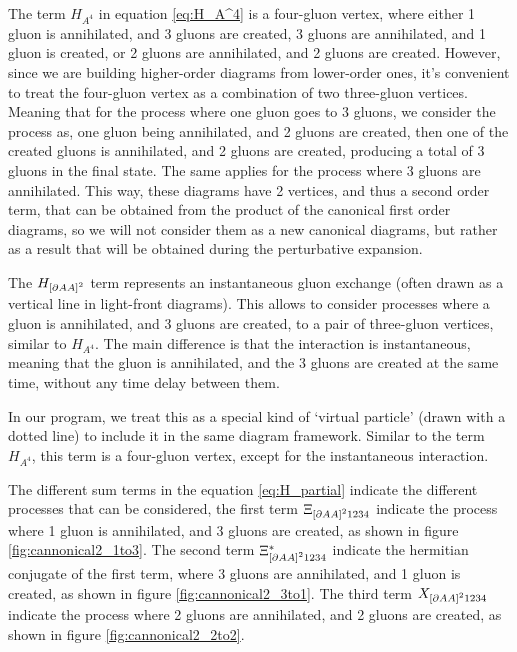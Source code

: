 \documentclass[11pt,a4paper,twoside,pdf]{article}
\numberwithin{equation}{section}
\begin{document}
The term $H_{A^4}$ in equation \eqref{eq:H_A^4} is a four-gluon vertex, where either
1 gluon is annihilated, and 3 gluons are created, 3 gluons are annihilated, and
1 gluon is created, or 2 gluons are annihilated, and 2 gluons are created. However, 
since we are building higher-order diagrams from lower-order ones, it’s convenient 
to treat the four-gluon vertex as a combination of two three-gluon vertices. Meaning that 
for the process where one gluon goes to 3 gluons, we consider the process as, 
one gluon being annihilated, and 2 gluons are created, then one of the
created gluons is annihilated, and 2 gluons are created, producing a total of 3 gluons
in the final state. The same applies for the process where 3 gluons are annihilated.
This way, these diagrams have 2 vertices, and thus a second order term, that 
can be obtained from the product of the canonical first order diagrams, so we 
will not consider them as a new canonical diagrams, but rather as a result that will
be obtained during the perturbative expansion.

The $H_{\left[ \partial A A \right]^2}$ term represents an instantaneous gluon exchange 
(often drawn as a vertical line in light-front diagrams). This allows to consider processes where a gluon is annihilated, and 3 gluons are created, to a 
pair of three-gluon vertices, similar to $H_{A^4}$. The main difference is that
the interaction is instantaneous, meaning that the gluon is annihilated, and the
3 gluons are created at the same time, without any time delay between them.

In our program, we treat this as a special kind of ‘virtual particle’ (drawn with 
a dotted line) to include it in the same diagram framework. Similar to the 
term $H_{A^4}$, this term is a four-gluon vertex, except for the instantaneous 
interaction. 

The different sum terms in the equation \eqref{eq:H_partial} indicate the different 
processes that can be considered, the first term $\Xi_{\left[ \partial A A \right]^2 1234}$
indicate the process where 1 gluon is annihilated, and 3 gluons are created, as shown in
figure \ref{fig:cannonical2_1to3}. The second term $\Xi_{\left[ \partial A A \right]^2 1234}^*$
indicate the hermitian conjugate of the first term, where 3 gluons are annihilated, and
1 gluon is created, as shown in figure \ref{fig:cannonical2_3to1}. The third term
$X_{\left[ \partial A A \right]^2 1234}$ indicate the process where 2 gluons are annihilated,
and 2 gluons are created, as shown in figure \ref{fig:cannonical2_2to2}.
\end{document}
